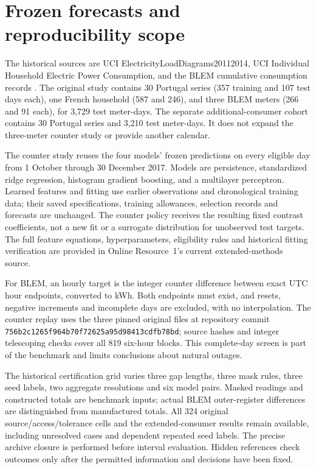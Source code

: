 \section{Frozen forecasts and reproducibility scope}
\label{app:historical-design}
The historical sources are UCI ElectricityLoadDiagrams20112014,
UCI Individual Household Electric Power Consumption, and the BLEM
cumulative consumption records \citep{portugal,uci,blem}.
The original study contains 30 Portugal series (357 training and 107 test
days each), one French household (587 and 246), and three BLEM meters
(266 and 91 each), for 3,729 test meter-days. The separate additional-consumer
cohort contains 30 Portugal series and 3,210 test meter-days. It does not
expand the three-meter counter study or provide another calendar.

The counter study reuses the four models' frozen predictions on every
eligible day from 1 October through 30 December 2017. Models are persistence,
standardized ridge regression, histogram gradient boosting, and a multilayer
perceptron. Learned features and fitting use earlier observations and
chronological training data; their saved specifications, training allowances,
selection records and forecasts are unchanged. The counter policy receives
the resulting fixed contrast coefficients, not a new fit or a surrogate
distribution for unobserved test targets. The full feature equations,
hyperparameters, eligibility rules and historical fitting verification are
provided in Online Resource~1's current extended-methods source.

For BLEM, an hourly target is the integer counter difference between exact
UTC hour endpoints, converted to kWh. Both endpoints must exist, and resets,
negative increments and incomplete days are excluded, with no interpolation.
The counter replay uses the three pinned original files at repository commit
\texttt{756b2c1265f964b70f72625a95d98413cdfb78bd}; source hashes and
integer telescoping checks cover all 819 six-hour blocks. This complete-day
screen is part of the benchmark and limits conclusions about natural outages.

The historical certification grid varies three gap lengths, three mask
rules, three seed labels, two aggregate resolutions and six model pairs.
Masked readings and constructed totals are benchmark inputs; actual BLEM
outer-register differences are distinguished from manufactured totals.
All 324 original source/access/tolerance cells and the extended-consumer
results remain available, including unresolved cases and dependent repeated
seed labels. The precise archive closure is performed before interval
evaluation. Hidden references check outcomes only after the permitted
information and decisions have been fixed.

